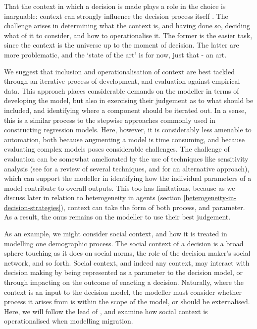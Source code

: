 \documentclass{article}
\begin{document}
That the context in which a decision is made plays a role in the choice is inarguable: context can strongly influence the decision process itself \citep{Ben-Akiva2012}. The challenge arises in determining what the context is, and having done so, deciding what of it to consider, and how to operationalise it. The former is the easier task, since the context is the universe up to the moment of decision. The latter are more problematic, and the `state of the art' is for now, just that - an art. 


We suggest that inclusion and operationalisation of context are best tackled through an iterative process of development, and evaluation against empirical data. This approach places considerable demands on the modeller in terms of developing the model, but also in exercising their judgement as to what should be included, and identifying where a component should be iterated out. In a sense, this is a similar process to the stepwise approaches commonly used in constructing regression models. Here, however, it is considerably less amenable to automation, both because augmenting a model is time consuming, and because evaluating complex models poses considerable challenges. The challenge of evaluation can be somewhat ameliorated by the use of techniques like sensitivity analysis (see \citet{Thiele2014} for a review of several techniques, and \citet{Oakley2004} for an alternative approach), which can support the modeller in identifying how the individual parameters of a model contribute to overall outputs. This too has limitations, because as we discuss later in relation to heterogeneity in agents (section \ref{heterogeneity-in-decision-strategies}), context can take the form of both process, and parameter.
As a result, the onus remains on the modeller to use their best judgement.

As an example, we might consider social context, and how it is treated in modelling one demographic process. The social context of a decision is a broad sphere touching as it does on social norms, the role of the decision maker's social network, and so forth. Social context, and indeed any context, may interact with decision making by being represented as a parameter to the decision model, or through impacting on the outcome of enacting a decision. Naturally, where the context is an input to the decision model, the modeller must consider whether process it arises from is within the scope of the model, or should be externalised.
Here, we will follow the lead of \citet{Klabunde}, and examine how social context is operationalised when modelling migration. 
\end{document}
